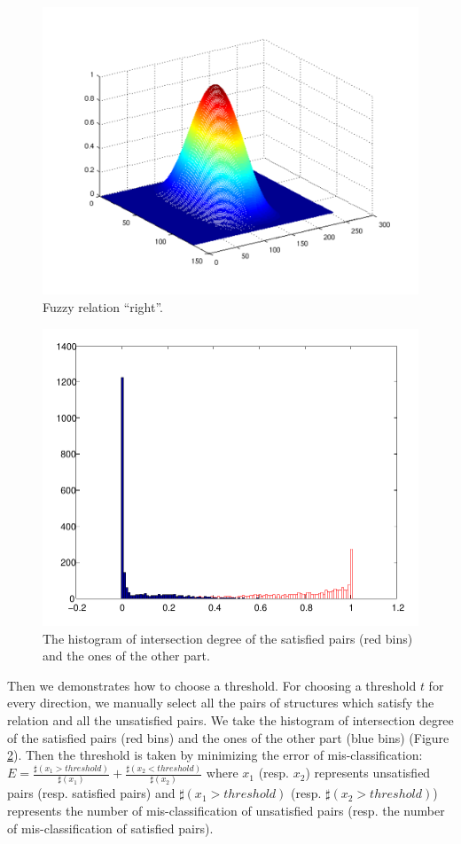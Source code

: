 \documentclass{article}
\begin{document}
\begin{figure}[h]
 \centering
 \includegraphics[width=.5\textwidth]{./figures/right_crop.pdf}
 \caption{\label{fig:right}Fuzzy relation ``right''.}
\end{figure}

\begin{figure}[h]
 \centering
 \includegraphics[width=.5\textwidth]{./figures/right_nright_thresh_crop.pdf}
 \caption{\label{fig:thresh}The histogram of intersection degree of the satisfied pairs (red bins) and the ones of the other part.}
\end{figure}

Then we demonstrates how to choose a threshold.
For choosing a threshold $t$ for every direction, we manually select all the pairs of structures which satisfy the relation and all the unsatisfied pairs.
We take the histogram of intersection degree of the satisfied pairs (red bins) and the ones of the other part (blue bins) (Figure \ref{fig:thresh}).
Then the threshold is taken by minimizing the error of mis-classification:
$E=\frac{\sharp(x_1>threshold)}{\sharp(x_1)}+\frac{\sharp(x_2<threshold)}{\sharp(x_2)}$ where $x_1$ (resp. $x_2$) represents unsatisfied pairs (resp. satisfied pairs) 
and $\sharp(x_1>threshold)$ (resp. $\sharp(x_2>threshold)$) represents the number of mis-classification of unsatisfied pairs (resp. the number of mis-classification of satisfied pairs).
\end{document}
